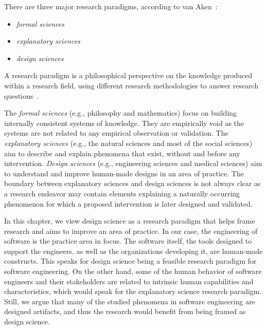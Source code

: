 \documentclass[graybox]{svmult}
\newcommand{\peggy}[1]{\textcolor{blue}{{\it [Peggy says: #1]}}}
\newcommand{\per}[1]{\textcolor{cyan}{{\it [Per says: #1]}}}
\newcommand{\peggy}[1]{}
\newcommand{\per}[1]{}
\begin{document}
There are three major research paradigms, according to van Aken~\cite{van_aken_management_2004}:
\begin{itemize}
\item \emph{formal sciences} %
\item \emph{explanatory sciences} %
\item \emph{design sciences}%
\end{itemize}

A research paradigm is a philosophical perspective on the knowledge produced within a research field, using different research methodologies to answer research questions~\cite{van_aken_management_2004}. %

The \emph{formal sciences} (e.g., philosophy and mathematics) focus on building internally consistent systems of knowledge. They are empirically void as the systems are not related to any empirical observation or validation. The \emph{explanatory sciences} (e.g., the natural sciences and most of the social sciences) aim to describe and explain phenomena that exist, without and before any intervention. \emph{Design sciences} (e.g., engineering sciences and medical sciences) aim to understand and improve human-made designs in an area of practice. The boundary between explanatory sciences and design sciences is not always clear as a research endeavor may contain elements explaining a naturally occurring phenomenon for which a proposed intervention is later designed and validated. 

In this chapter, we view design science as a research paradigm that helps frame research and aims to improve an area of practice. In our case, the engineering of software is the practice area in focus. The software itself, the tools designed to support the engineers, as well as the organizations developing it, are human-made constructs. This speaks for design science being a feasible research paradigm for software engineering. On the other hand, some of the human behavior of software engineers and their stakeholders are related to intrinsic human capabilities and characteristics, which would speak for the explanatory science research paradigm. Still, we argue that many of the studied phenomena in software engineering are designed artifacts, and thus the research would benefit from being framed as design science.
\end{document}
